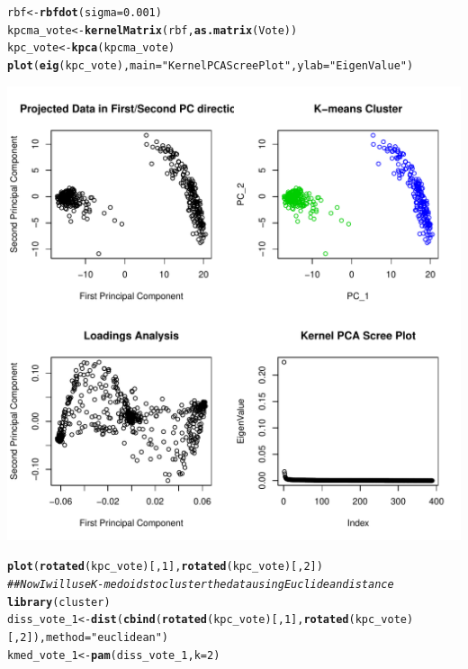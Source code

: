 \documentclass{article}\usepackage[]{graphicx}\usepackage[]{color}
\makeatletter
\def\maxwidth{ %
  \ifdim\Gin@nat@width>\linewidth
    \linewidth
  \else
    \Gin@nat@width
  \fi
}
\newcommand{\hlnum}[1]{\textcolor[rgb]{0.686,0.059,0.569}{#1}}%
\newcommand{\hlstr}[1]{\textcolor[rgb]{0.192,0.494,0.8}{#1}}%
\newcommand{\hlcom}[1]{\textcolor[rgb]{0.678,0.584,0.686}{\textit{#1}}}%
\newcommand{\hlstd}[1]{\textcolor[rgb]{0.345,0.345,0.345}{#1}}%
\newcommand{\hlkwb}[1]{\textcolor[rgb]{0.69,0.353,0.396}{#1}}%
\newcommand{\hlkwc}[1]{\textcolor[rgb]{0.333,0.667,0.333}{#1}}%
\newcommand{\hlkwd}[1]{\textcolor[rgb]{0.737,0.353,0.396}{\textbf{#1}}}%
\newenvironment{kframe}{%
 \def\at@end@of@kframe{}%
 \ifinner\ifhmode%
  \def\at@end@of@kframe{\end{minipage}}%
  \begin{minipage}{\columnwidth}%
 \fi\fi%
 \def\FrameCommand##1{\hskip\@totalleftmargin \hskip-\fboxsep
 \colorbox{shadecolor}{##1}\hskip-\fboxsep
     \hskip-\linewidth \hskip-\@totalleftmargin \hskip\columnwidth}%
 \MakeFramed {\advance\hsize-\width
   \@totalleftmargin\z@ \linewidth\hsize
   \@setminipage}}%
 {\par\unskip\endMakeFramed%
 \at@end@of@kframe}
\newenvironment{knitrout}{}{} %
\makeatother
\begin{document}
\begin{knitrout}
\begin{kframe}
{\ttfamily\noindent\color{warningcolor}{\#\# Warning: package 'kernlab' was built under R version 3.0.2}}\begin{alltt}
\hlstd{rbf} \hlkwb{<-} \hlkwd{rbfdot}\hlstd{(}\hlkwc{sigma} \hlstd{=} \hlnum{0.001}\hlstd{)}
\hlstd{kpcma_vote} \hlkwb{<-} \hlkwd{kernelMatrix}\hlstd{(rbf,} \hlkwd{as.matrix}\hlstd{(Vote))}
\hlstd{kpc_vote} \hlkwb{<-} \hlkwd{kpca}\hlstd{(kpcma_vote)}
\hlkwd{plot}\hlstd{(}\hlkwd{eig}\hlstd{(kpc_vote),} \hlkwc{main} \hlstd{=} \hlstr{"Kernel PCA Scree Plot"}\hlstd{,} \hlkwc{ylab} \hlstd{=} \hlstr{"EigenValue"}\hlstd{)}
\end{alltt}
\end{kframe}
\includegraphics[width=\maxwidth]{figure/minimal-Problem_One1} 
\begin{kframe}\begin{alltt}
\hlkwd{plot}\hlstd{(}\hlkwd{rotated}\hlstd{(kpc_vote)[,} \hlnum{1}\hlstd{],} \hlkwd{rotated}\hlstd{(kpc_vote)[,} \hlnum{2}\hlstd{])}
\hlcom{## Now I will use K-medoids to cluster the data using Euclidean distance}
\hlkwd{library}\hlstd{(cluster)}
\hlstd{diss_vote_1} \hlkwb{<-} \hlkwd{dist}\hlstd{(}\hlkwd{cbind}\hlstd{(}\hlkwd{rotated}\hlstd{(kpc_vote)[,} \hlnum{1}\hlstd{],} \hlkwd{rotated}\hlstd{(kpc_vote)[,} \hlnum{2}\hlstd{]),} \hlkwc{method} \hlstd{=} \hlstr{"euclidean"}\hlstd{)}
\hlstd{kmed_vote_1} \hlkwb{<-} \hlkwd{pam}\hlstd{(diss_vote_1,} \hlkwc{k} \hlstd{=} \hlnum{2}\hlstd{)}

\end{alltt}
\end{kframe}
\end{knitrout}
\end{document}
